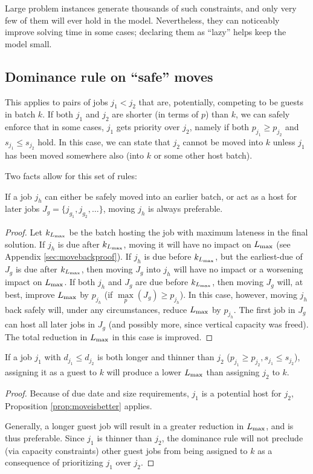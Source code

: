 \documentclass[13pt, letterpaper, oneside]{book}
\begin{document}
Large problem instances generate thousands of such constraints, and only very
few of them will ever hold in the model. Nevertheless, they can noticeably
improve solving time in some cases; declaring them as ``lazy'' helps keep
the model small.

\subsection{Dominance rule on ``safe'' moves}
This applies to pairs of jobs $j_1 < j_2$ that are, potentially, competing
to be guests in batch $k$. If both $j_1$ and $j_2$ are shorter (in terms of $p$)
than $k$, we can safely enforce that in some cases, $j_1$ gets priority over
$j_2$, namely if both $p_{j_1} \geq p_{j_2}$ and $s_{j_1} \leq s_{j_2}$ hold. In
this case, we can state that $j_2$ cannot be moved into $k$ unless $j_1$ has
been moved somewhere also (into $k$ or some other host batch).

Two facts allow for this set of rules:
\begin{proposition}If a job $j_h$ can either be safely moved into an earlier batch,
\textrm{or} act as a host for later jobs $J_g = \{j_{g_1}, j_{g_2}, \dots\}$,
moving $j_h$ is always preferable. \label{prop:moveisbetter}

\begin{proof}
Let $k_{L_{\text{max}}}$ be the batch hosting the job with maximum lateness in the final
solution. If $j_h$ is due after $k_{L_{\text{max}}}$, moving it will have no impact on
$L_{\text{max}}$ (see Appendix \ref{sec:movebackproof}). If $j_h$ is due before
$k_{L_{\text{max}}}$, but the earliest-due of $J_g$ is due after $k_{L_{\text{max}}}$, then moving
$J_g$ into $j_h$ will have no impact or a worsening impact on $L_{\text{max}}$. If both
$j_h$ and $J_g$ are due before $k_{L_{\text{max}}}$, then moving $J_g$ will, at best,
improve $L_{\text{max}}$ by $p_{j_h}$ (if $\underset{p}{\max}(J_g) \geq p_{j_h}$). In
this case, however, moving $j_h$ back safely will, under any circumstances,
reduce $L_{\text{max}}$ by $p_{j_h}$. The first job in $J_g$ can host all later jobs in
$J_g$ (and possibly more, since vertical capacity was freed). The total
reduction in $L_{\text{max}}$ in this case is improved.
\end{proof}
\end{proposition}

\begin{proposition} If a job $j_1$ with $d_{j_1} \leq d_{j_2}$ is both longer
and thinner than $j_2$ ($p_{j_1} \geq p_{j_2}, s_{j_1} \leq s_{j_2}$), assigning
it as a guest to $k$ will produce a lower $L_{\text{max}}$ than assigning $j_2$ to $k$.

\begin{proof}
Because of due date and size requirements, $j_1$ is a potential host for $j_2$,
Proposition \ref{prop:moveisbetter} applies. 

Generally, a longer guest job will result in a greater reduction in $L_{\text{max}}$, and
is thus preferable. Since $j_1$ is thinner than $j_2$, the dominance rule will
not preclude (via capacity constraints) other guest jobs from being assigned to
$k$ as a consequence of prioritizing $j_1$ over $j_2$.
\end{proof}
\end{proposition}
\end{document}

